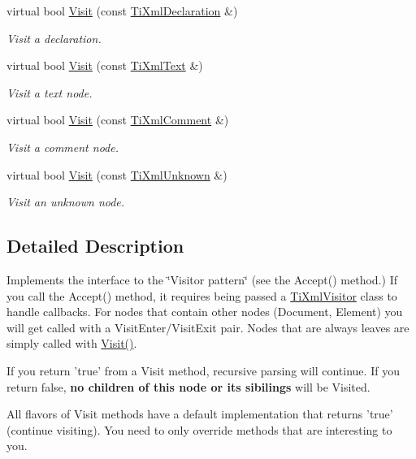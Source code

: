 \begin{DoxyCompactItemize}
virtual bool \hyperlink{class_ti_xml_visitor_afad71c71ce6473fb9b4b64cd92de4a19}{Visit} (const \hyperlink{class_ti_xml_declaration}{Ti\+Xml\+Declaration} \&)
\begin{DoxyCompactList}\small\item\em Visit a declaration. \end{DoxyCompactList}\item 
virtual bool \hyperlink{class_ti_xml_visitor_a399b8ebca5cd14664974a32d2ce029e5}{Visit} (const \hyperlink{class_ti_xml_text}{Ti\+Xml\+Text} \&)
\begin{DoxyCompactList}\small\item\em Visit a text node. \end{DoxyCompactList}\item 
virtual bool \hyperlink{class_ti_xml_visitor_a53a60e7a528627b31af3161972cc7fa2}{Visit} (const \hyperlink{class_ti_xml_comment}{Ti\+Xml\+Comment} \&)
\begin{DoxyCompactList}\small\item\em Visit a comment node. \end{DoxyCompactList}\item 
virtual bool \hyperlink{class_ti_xml_visitor_a7e284d607d275c51dac1adb58159ce28}{Visit} (const \hyperlink{class_ti_xml_unknown}{Ti\+Xml\+Unknown} \&)
\begin{DoxyCompactList}\small\item\em Visit an unknown node. \end{DoxyCompactList}\end{DoxyCompactItemize}


\subsection{Detailed Description}
Implements the interface to the \char`\"{}\+Visitor pattern\char`\"{} (see the Accept() method.) If you call the Accept() method, it requires being passed a \hyperlink{class_ti_xml_visitor}{Ti\+Xml\+Visitor} class to handle callbacks. For nodes that contain other nodes (Document, Element) you will get called with a Visit\+Enter/\+Visit\+Exit pair. Nodes that are always leaves are simply called with \hyperlink{class_ti_xml_visitor_afad71c71ce6473fb9b4b64cd92de4a19}{Visit()}.

If you return 'true' from a Visit method, recursive parsing will continue. If you return false, {\bfseries no children of this node or its sibilings} will be Visited.

All flavors of Visit methods have a default implementation that returns 'true' (continue visiting). You need to only override methods that are interesting to you.

